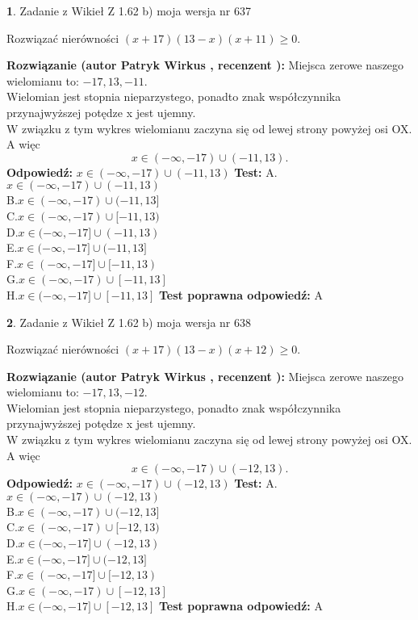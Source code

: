 \documentclass[12pt, a4paper]{article}
\theoremstyle{definition} %
\newtheorem{zad}{}
\newcommand{\zadStart}[1]{\begin{zad}#1\newline}
\newcommand{\zadStop}{\end{zad}}
\newcommand{\rozwStart}[2]{\noindent \textbf{Rozwiązanie (autor #1 , recenzent #2): }\newline}
\newcommand{\rozwStop}{\newline}
\newcommand{\odpStart}{\noindent \textbf{Odpowiedź:}\newline}
\newcommand{\odpStop}{\newline}
\newcommand{\testStart}{\noindent \textbf{Test:}\newline}
\newcommand{\testStop}{\newline}
\newcommand{\kluczStart}{\noindent \textbf{Test poprawna odpowiedź:}\newline}
\newcommand{\kluczStop}{\newline}
\begin{document}
\zadStart{Zadanie z Wikieł Z 1.62 b) moja wersja nr 637}

Rozwiązać nierówności $(x+17)(13-x)(x+11)\ge0$.
\zadStop
\rozwStart{Patryk Wirkus}{}
Miejsca zerowe naszego wielomianu to: $-17, 13, -11$.\\
Wielomian jest stopnia nieparzystego, ponadto znak współczynnika przy\linebreak najwyższej potędze x jest ujemny.\\ W związku z tym wykres wielomianu zaczyna się od lewej strony powyżej osi OX. A więc $$x \in (-\infty,-17) \cup (-11,13).$$
\rozwStop
\odpStart
$x \in (-\infty,-17) \cup (-11,13)$
\odpStop
\testStart
A.$x \in (-\infty,-17) \cup (-11,13)$\\
B.$x \in (-\infty,-17) \cup (-11,13]$\\
C.$x \in (-\infty,-17) \cup [-11,13)$\\
D.$x \in (-\infty,-17] \cup (-11,13)$\\
E.$x \in (-\infty,-17] \cup (-11,13]$\\
F.$x \in (-\infty,-17] \cup [-11,13)$\\
G.$x \in (-\infty,-17) \cup [-11,13]$\\
H.$x \in (-\infty,-17] \cup [-11,13]$
\testStop
\kluczStart
A
\kluczStop



\zadStart{Zadanie z Wikieł Z 1.62 b) moja wersja nr 638}

Rozwiązać nierówności $(x+17)(13-x)(x+12)\ge0$.
\zadStop
\rozwStart{Patryk Wirkus}{}
Miejsca zerowe naszego wielomianu to: $-17, 13, -12$.\\
Wielomian jest stopnia nieparzystego, ponadto znak współczynnika przy\linebreak najwyższej potędze x jest ujemny.\\ W związku z tym wykres wielomianu zaczyna się od lewej strony powyżej osi OX. A więc $$x \in (-\infty,-17) \cup (-12,13).$$
\rozwStop
\odpStart
$x \in (-\infty,-17) \cup (-12,13)$
\odpStop
\testStart
A.$x \in (-\infty,-17) \cup (-12,13)$\\
B.$x \in (-\infty,-17) \cup (-12,13]$\\
C.$x \in (-\infty,-17) \cup [-12,13)$\\
D.$x \in (-\infty,-17] \cup (-12,13)$\\
E.$x \in (-\infty,-17] \cup (-12,13]$\\
F.$x \in (-\infty,-17] \cup [-12,13)$\\
G.$x \in (-\infty,-17) \cup [-12,13]$\\
H.$x \in (-\infty,-17] \cup [-12,13]$
\testStop
\kluczStart
A
\kluczStop
\end{document}
